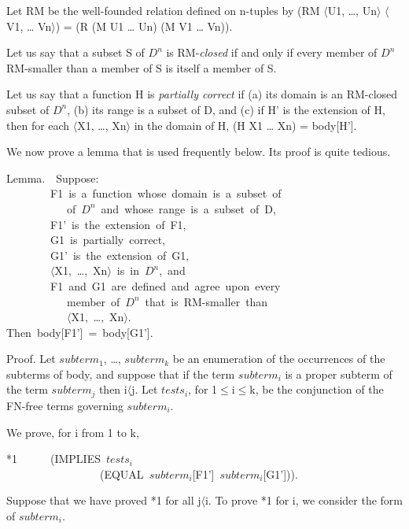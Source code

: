 \documentclass[11pt]{book}
\newenvironment{pubasis}{\begin{flushleft}\ttfamily\small}{\normalsize\rmfamily\end{flushleft}}
\newcommand{\pubinlineunderline}[1]{\emph{#1}}
\begin{document}
Let RM be the well-founded relation defined on n-tuples by
(RM $\langle$U1, \ldots{}, Un$\rangle$ $\langle$V1, \ldots{} Vn$\rangle$) = (R (M U1 \ldots{} Un) (M V1 \ldots{} Vn)).

Let us say that a subset S of $D^{n}$ is RM-\pubinlineunderline{closed} if and only
if every member of $D^{n}$ RM-smaller than a member of S is
itself a member of S.

Let us say that a function H is \pubinlineunderline{partially correct} if (a)
its domain is an RM-closed subset of $D^{n}$, (b) its range is a
subset of D, and (c) if H' is the extension of H, then for each
$\langle$X1, \ldots{}, Xn$\rangle$ in the domain of H, (H X1 \ldots{} Xn) = body[H'].

We now prove a lemma that is used frequently below.  Its proof
is quite tedious.
\begin{pubasis}
Lemma.~~Suppose:\\

~~~~~~~~F1~is~a~function~whose~domain~is~a~subset~of\\
~~~~~~~~~~~of~$D^{n}$~and~whose~range~is~a~subset~of~D,\\
~~~~~~~~F1'~is~the~extension~of~F1,\\
~~~~~~~~G1~is~partially~correct,\\
~~~~~~~~G1'~is~the~extension~of~G1,\\
~~~~~~~~$\langle$X1,~\ldots{},~Xn$\rangle$~is~in~$D^{n}$,~and\\
~~~~~~~~F1~and~G1~are~defined~and~agree~upon~every\\
~~~~~~~~~~~member~of~$D^{n}$~that~is~RM-smaller~than\\
~~~~~~~~~~~$\langle$X1,~\ldots{},~Xn$\rangle$.\\

Then~body[F1']~=~body[G1'].\\
\end{pubasis}

Proof.  Let $subterm_{1}$, \ldots{}, $subterm_{k}$ be an enumeration of the
occurrences of the subterms of body, and suppose that if the term
$subterm_{i}$ is a proper subterm of the term $subterm_{j}$ then i$\langle$j.
Let $tests_{i}$, for 1$\leq$i$\leq$k, be the  conjunction of the FN-free
terms governing $subterm_{i}$.

We prove, for i from 1 to k,
\begin{pubasis}
*1~~~~~~(IMPLIES~$tests_{i}$\\
~~~~~~~~~~~~~~~~~(EQUAL~$subterm_{i}$[F1']~$subterm_{i}$[G1'])).\\
\end{pubasis}
Suppose that we have proved *1 for all j$\langle$i.  To prove *1 for i, we consider the form
of $subterm_{i}$.
\end{document}
